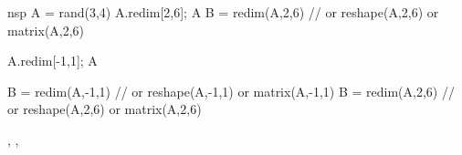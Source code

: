 \begin{examples}
\begin{mintednsp}{nsp}
A = rand(3,4)
A.redim[2,6]; A
B = redim(A,2,6)    // or reshape(A,2,6) or matrix(A,2,6)

A.redim[-1,1]; A    

B = redim(A,-1,1)   // or reshape(A,-1,1) or matrix(A,-1,1)
B = redim(A,2,6)    // or reshape(A,2,6) or matrix(A,2,6)
\end{mintednsp}
\end{examples}

\begin{manseealso}
   , ,  
\end{manseealso}

